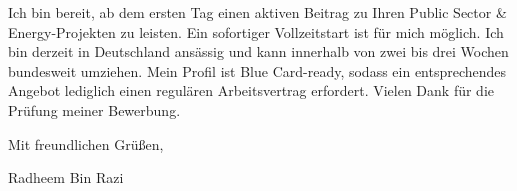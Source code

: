 \documentclass[11pt,a4paper]{coverletter}
\begin{document}
Ich bin bereit, ab dem ersten Tag einen aktiven Beitrag zu Ihren Public Sector \& Energy-Projekten zu leisten. Ein sofortiger Vollzeitstart ist für mich möglich. Ich bin derzeit in Deutschland ansässig und kann innerhalb von zwei bis drei Wochen bundesweit umziehen. Mein Profil ist Blue Card-ready, sodass ein entsprechendes Angebot lediglich einen regulären Arbeitsvertrag erfordert. Vielen Dank für die Prüfung meiner Bewerbung.

\closing{Mit freundlichen Grüßen,}{Radheem Bin Razi}
\end{document}
